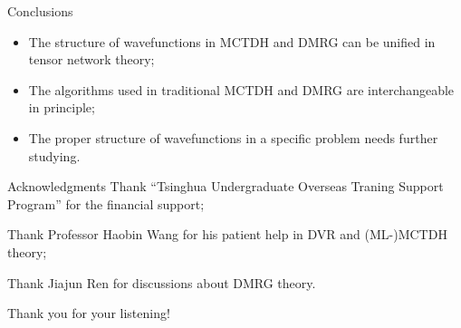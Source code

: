 \documentclass[12pt]{beamer}
\begin{document}
    \begin{frame}{Conclusions}
        \begin{itemize}
            \item The structure of wavefunctions in  MCTDH and DMRG can be unified in tensor network theory;
            \item The algorithms used in traditional MCTDH and DMRG are interchangeable in principle;
            \item The proper structure of wavefunctions in a specific problem needs further studying.
        \end{itemize}
    \end{frame}

    \begin{frame}{Acknowledgments}
        Thank ``Tsinghua Undergraduate Overseas Traning Support Program'' for the financial support;

        Thank Professor Haobin Wang for his patient help in DVR and (ML-)MCTDH theory;

        Thank Jiajun Ren for discussions about DMRG theory.

        \begin{center}
            \large
            Thank you for your listening!
        \end{center}
    \end{frame}
\end{document}
